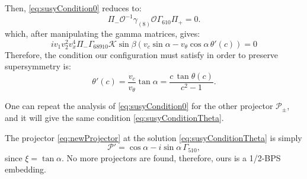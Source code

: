 Then, \eqref{eq:susyCondition0} reduces to:
\begin{equation}
 \Pi_{-} \mathcal{O}^{-1} \gamma_{(8)} \mathcal{O} \Gamma_{610} \Pi_{+}  = 0.
\end{equation}
which, after manipulating the gamma matrices, gives:
\begin{equation}
i v_1 v_2^2 v_x^4 \Pi_- \Gamma_{6 8 9 10} \mathcal{K} \sin\beta \left(v_c \sin\alpha - v_\theta \cos\alpha \, \theta'(c)\right) = 0
\end{equation}
Therefore, the condition our configuration must satisfy in order to preserve supersymmetry is:
\begin{equation}\label{eq:susyConditionTheta}
 \theta'(c) = \dfrac{v_c}{v_\theta} \tan\alpha = \dfrac{c \, \tan\theta(c)}{c^2-1} .
\end{equation}


One can repeat the analysis of \eqref{eq:susyCondition0} for the other projector $\mathcal{P}_{\pm}$, and it will give the same condition \eqref{eq:susyConditionTheta}.


The projector \eqref{eq:newProjector} at the solution \eqref{eq:susyConditionTheta} is simply
\begin{equation}
\mathcal{P}' = \cos \alpha - i \sin \alpha \, \Gamma_{510},
\end{equation}
since $ \xi =  \tan \alpha $.
No more projectors are found, therefore, ours is a 1/2-BPS embedding.



